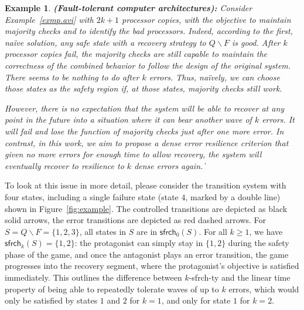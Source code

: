 \documentclass[times,10pt,twocolumn]{article}
\newtheorem{example}[theorem]{Example}
\newcommand\safe{\mathsf{sfrch}}
\newcommand\qed{\hfill\ensuremath{\Box}}
\def\qed{\ifmmode\|\else{\unskip\nobreak\hfil
\penalty50\hskip1em\null\nobreak\hfil$\blacksquare$
\parfillskip=0pt\finalhyphendemerits=0\endgraf}\fi}
\begin{document}
\begin{example} 
{\bf (Fault-tolerant computer architectures):}  
\label{exmp.avi.revisit}
Consider Example~\ref{exmp.avi} with $2k+1$ processor copies, 
with the objective to maintain majority checks
and to identify the bad processors. 
Indeed, according to the first, na\"ive solution, 
any safe state with a recovery strategy to 
$Q\smallsetminus F$ is good.   
After $k$ processor copies fail, 
the majority checks are still capable to maintain the correctness
of the combined behavior to follow the design of the original system.  
There seems to be nothing to do after $k$ errors.  
Thus, na\"ively, we can choose those states as the safety region
\label{reply1.majority.checks.as.safety.regions} if, 
at those states, majority checks still work.  

However, there is no expectation that the system will be able
to recover at any point in the future into a situation where it can bear 
another wave of $k$ errors.   
It will fail and lose the function of majority checks just after one more error.  
In contrast, in this work, we aim to propose a dense error resilience criterion that 
given no more errors for enough time to allow recovery, 
the system will eventually recover to resilience to $k$ dense errors again. 
\qed 
\end{example} 

To look at this issue in more detail, 
please consider the transition system with four states, 
including a single failure state
(state $4$, marked by a double line) shown in Figure~\ref{fig:example}.
The controlled transitions are depicted as black solid arrows, 
the error transitions are depicted as red dashed arrows.
For $S=Q\smallsetminus F=\{1,2,3\}$, all states in $S$ are in $\safe_0(S)$.
For all $k \geq 1$, we have $\safe_k(S)=\{1,2\}$:
the protagonist can simply stay in $\{1,2\}$ 
during the safety phase of the game, and once the antagonist 
plays an error transition, the game progresses 
into the recovery segment, where the protagonist's objective 
is satisfied immediately.
This outlines the difference between $k$-sfrch-ty and 
the linear time property
of being able to repeatedly tolerate waves of up to $k$ errors, 
which would only be satisfied by states $1$ and $2$ for 
$k = 1$, and only for state $1$ for $k = 2$.
\end{document}
